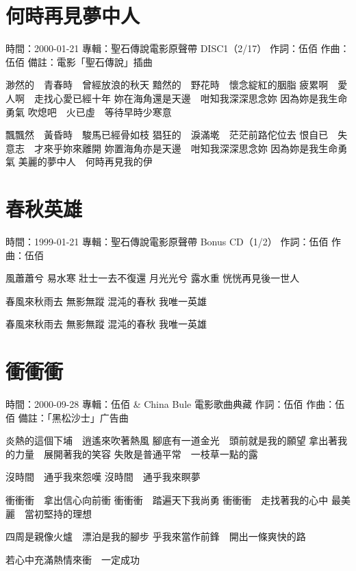 \documentclass[UTF8,a4paper,oneside,twocolumn,12pt]{ctexbook}
\newcommand{\infopair}[2]{\textbullet #1：#2}
\newcommand{\zc}[1][伍佰]{\infopair{作詞}{#1}}
\newcommand{\zq}[1][伍佰]{\infopair{作曲}{#1}}
\newcommand{\zj}[1]{\infopair{專輯}{#1}}
\newcommand{\sj}[1]{\infopair{時間}{#1}}
\newcommand{\bz}[1]{\infopair{備註}{#1}}
\newenvironment{info}{\begin{flushleft}\kaishu
	}
	{\end{flushleft}\normalsize\yahei\par}
\newenvironment{lyric}{
	}
{}
\begin{document}
\section{何時再見夢中人}
\begin{info}
	\sj{2000-01-21}
	\zj{聖石傳說電影原聲帶 DISC1（2/17）}
	\zc
	\zq
	\bz{電影「聖石傳說」插曲}
\end{info}
\begin{lyric}
	渺然的　青春時　曾經放浪的秋天
	黯然的　野花時　懷念綻紅的胭脂
	疲累啊　愛人啊　走找心愛已經十年
	妳在海角還是天邊　咁知我深深思念妳
	因為妳是我生命勇氣
	吹熄吧　火已虛　等待早時少寒意

	飄飄然　黃昏時　駿馬已經骨如枝
	猖狂的　淚滿墘　茫茫前路佗位去
	恨自已　失意志　才來乎妳來離開
	妳置海角亦是天邊　咁知我深深思念妳
	因為妳是我生命勇氣
	美麗的夢中人　何時再見我的伊
\end{lyric}

\section{春秋英雄}
\begin{info}
	\sj{1999-01-21}
	\zj{聖石傳說電影原聲帶 Bonus CD（1/2）}
	\zc
	\zq
\end{info}
\begin{lyric}
	風蕭蕭兮 易水寒 壯士一去不復還
	月光光兮 露水重 恍恍再見後一世人

	春風來秋雨去 無影無蹤
	混沌的春秋 我唯一英雄

	春風來秋雨去 無影無蹤
	混沌的春秋 我唯一英雄
\end{lyric}

\section{衝衝衝}
\begin{info}
	\sj{2000-09-28}
	\zj{伍佰 \& China Bule 電影歌曲典藏}
	\zc
	\zq
	\bz{「黑松沙士」广告曲}
\end{info}
\begin{lyric}
	炎熱的這個下埔　逍遙來吹著熱風
	腳底有一道金光　頭前就是我的願望
	拿出著我的力量　展開著我的笑容
	失敗是普通平常　一枝草一點的露

	沒時間　通乎我來怨嘆
	沒時間　通乎我來瞑夢

	衝衝衝　拿出信心向前衝
	衝衝衝　踏遍天下我尚勇
	衝衝衝　走找著我的心中
	最美麗　當初堅持的理想

	四周是親像火爐　漂泊是我的腳步
	乎我來當作前鋒　開出一條爽快的路

	若心中充滿熱情來衝　一定成功
\end{lyric}
\end{document}
